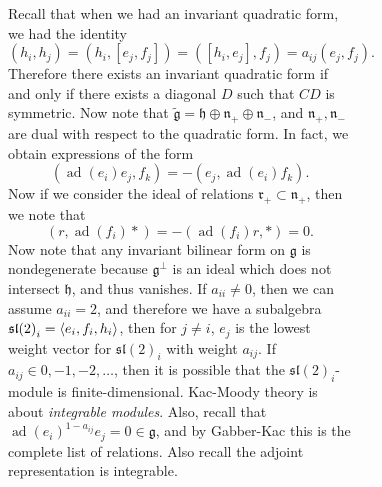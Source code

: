 \documentclass[leqno, openany]{memoir}
\theoremstyle{definition}
\theoremstyle{remark}
\theoremstyle{plain}
\theoremstyle{definition}
\theoremstyle{remark}
\newcommand{\mf}[1]{\mathfrak{#1}}
\newcommand{\wtl}[1]{\widetilde{#1}}
\DeclareMathOperator{\ad}{ad}
\begin{document}
\begin{figure}[H]
\begin{figure}[H]
Recall that when we had an invariant quadratic form, we had the identity \[
(h_i, h_j) = (h_i, [e_j, f_j]) = ([h_i, e_j], f_j) = a_{ij} (e_j, f_j). \]
Therefore there exists an invariant quadratic form if and only if there exists
a diagonal $D$ such that $CD$ is symmetric. Now note that $\wtl{ \mf{g} } =
\mf{h} \oplus \mf{n}_+ \oplus \mf{n}_-$, and $\mf{n}_+, \mf{n}_-$ are dual with
respect to the quadratic form. In fact, we obtain expressions of the form \[ (
    \ad(e_i) e_j, f_k ) = - (e_j, \ad(e_i) f_k). \] Now if we consider the
    ideal of relations $\mf{r}_+ \subset \mf{n}_+$, then we note that \[ (r,
    \ad(f_i) *) = - (\ad(f_i) r, *) = 0. \] Now note that any invariant
    bilinear form on $\mf{g}$ is nondegenerate because $\mf{g}^{\perp}$ is an
    ideal which does not intersect $\mf{h}$, and thus vanishes. If $a_{ii} \neq
    0$, then we can assume $a_{ii} = 2$, and therefore we have a subalgebra
    ${\mf{sl}(2)}_i = \ev{e_i, f_i, h_i}$, then for $j \neq i$, $e_j$ is the
    lowest weight vector for ${\mf{sl}(2)}_i$ with weight $a_{ij}$. If $a_{ij}
    \in 0,-1,-2,\ldots$, then it is possible that the ${\mf{sl}(2)}_i$-module
    is finite-dimensional. Kac-Moody theory is about \textit{integrable
    modules}. Also, recall that ${\ad(e_i)}^{1-a_{ij}} e_j = 0 \in \mf{g}$, and
    by Gabber-Kac this is the complete list of relations. Also recall the
    adjoint representation is integrable.


\end{figure}
\end{figure}
\end{document}

